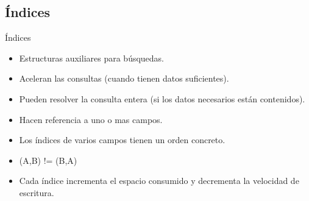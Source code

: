 
\subsection{Índices}
\begin{frame}{Índices}
  \begin{itemize}
    \item Estructuras auxiliares para búsquedas.
    \item Aceleran las consultas (cuando tienen datos suficientes).
    \item Pueden resolver la consulta entera (si los datos necesarios están contenidos).
    \item Hacen referencia a uno o mas campos.
    \item Los índices de varios campos tienen un orden concreto.
    \item (A,B) != (B,A)
    \item Cada índice incrementa el espacio consumido y decrementa la velocidad de escritura.
  \end{itemize}
\end{frame}

